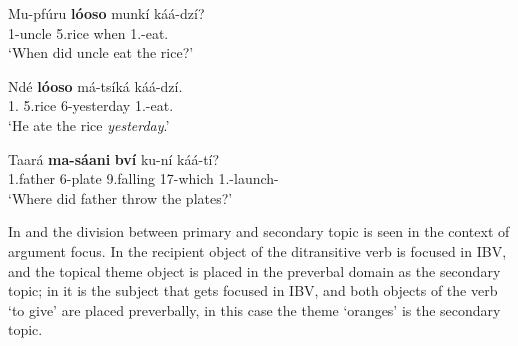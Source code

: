 \documentclass[output=paper,colorlinks,citecolor=brown,
]{langscibook}
\begin{document}
\begin{exe}
    \ex \label{106}
    \begin{xlist}
\ex
\label{106a}
\gll
Mu-pfúru \textbf{lóoso} munkí káá-dzí?\\
1-uncle 5.rice when 1\Sm{}.\Pst{}-eat.\Pst{}\\
\trans ‘When did uncle eat the rice?’

\ex
\label{106b}
\gll
Ndé \textbf{lóoso} má-tsíká káá-dzí.\\
1.\Pro{} 5.rice 6-yesterday 1\Sm{}.\Pst{}-eat.\Pst{}\\
\trans ‘He ate the rice \textit{yesterday}.’

    \end{xlist}

\ex
\label{107}
\gll
Taará \textbf{ma-sáani} \textbf{bví} ku-ní káá-tí?\\
1.father 6-plate 9.falling 17-which 1\Sm{}.\Pst{}-launch-\Pst{}\\
\trans ‘Where did father throw the plates?’

\end{exe}
In  and  the division between primary and secondary topic is seen in the context of argument focus. In  the recipient object of the ditransitive verb is focused in IBV, and the topical theme object is placed in the preverbal domain as the secondary topic; in  it is the subject that gets focused in IBV, and both objects of the verb `to give' are placed preverbally, in this case the theme `oranges' is the secondary topic.
\end{document}
